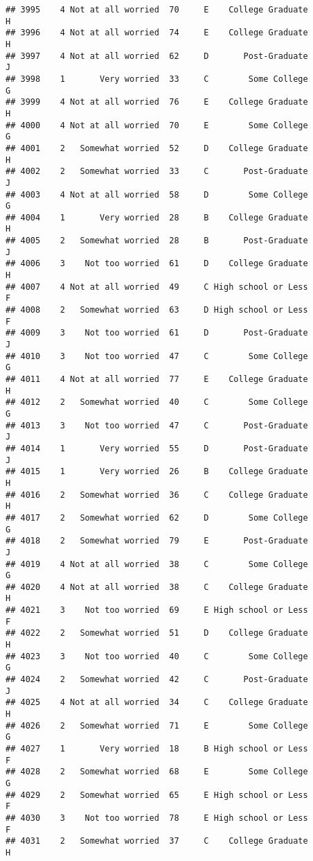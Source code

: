\documentclass[
]{article}
\begin{document}
\begin{verbatim}
## 3995    4 Not at all worried  70     E    College Graduate         H
## 3996    4 Not at all worried  74     E    College Graduate         H
## 3997    4 Not at all worried  62     D       Post-Graduate         J
## 3998    1       Very worried  33     C        Some College         G
## 3999    4 Not at all worried  76     E    College Graduate         H
## 4000    4 Not at all worried  70     E        Some College         G
## 4001    2   Somewhat worried  52     D    College Graduate         H
## 4002    2   Somewhat worried  33     C       Post-Graduate         J
## 4003    4 Not at all worried  58     D        Some College         G
## 4004    1       Very worried  28     B    College Graduate         H
## 4005    2   Somewhat worried  28     B       Post-Graduate         J
## 4006    3    Not too worried  61     D    College Graduate         H
## 4007    4 Not at all worried  49     C High school or Less         F
## 4008    2   Somewhat worried  63     D High school or Less         F
## 4009    3    Not too worried  61     D       Post-Graduate         J
## 4010    3    Not too worried  47     C        Some College         G
## 4011    4 Not at all worried  77     E    College Graduate         H
## 4012    2   Somewhat worried  40     C        Some College         G
## 4013    3    Not too worried  47     C       Post-Graduate         J
## 4014    1       Very worried  55     D       Post-Graduate         J
## 4015    1       Very worried  26     B    College Graduate         H
## 4016    2   Somewhat worried  36     C    College Graduate         H
## 4017    2   Somewhat worried  62     D        Some College         G
## 4018    2   Somewhat worried  79     E       Post-Graduate         J
## 4019    4 Not at all worried  38     C        Some College         G
## 4020    4 Not at all worried  38     C    College Graduate         H
## 4021    3    Not too worried  69     E High school or Less         F
## 4022    2   Somewhat worried  51     D    College Graduate         H
## 4023    3    Not too worried  40     C        Some College         G
## 4024    2   Somewhat worried  42     C       Post-Graduate         J
## 4025    4 Not at all worried  34     C    College Graduate         H
## 4026    2   Somewhat worried  71     E        Some College         G
## 4027    1       Very worried  18     B High school or Less         F
## 4028    2   Somewhat worried  68     E        Some College         G
## 4029    2   Somewhat worried  65     E High school or Less         F
## 4030    3    Not too worried  78     E High school or Less         F
## 4031    2   Somewhat worried  37     C    College Graduate         H

\end{verbatim}
\end{document}
